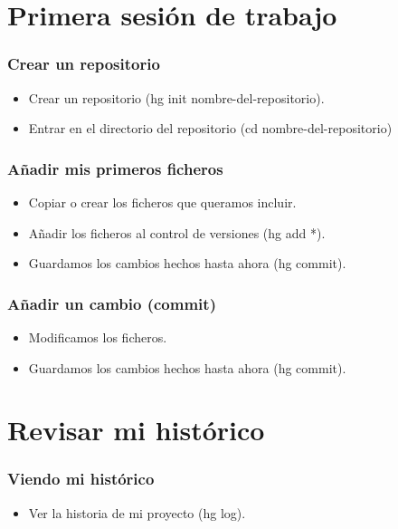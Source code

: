 \documentclass[10pt]{beamer}
\begin{document}
  \section*{Primera sesión de trabajo}

  \begin{frame}[containsverbatim]
    \frametitle{Crear un repositorio}
    \begin{itemize}
      \item Crear un repositorio (hg init nombre-del-repositorio).
      \item Entrar en el directorio del repositorio (cd nombre-del-repositorio)
    \end{itemize}
  \end{frame}

  \begin{frame}[containsverbatim]
    \frametitle{Añadir mis primeros ficheros}
    \begin{itemize}
      \item Copiar o crear los ficheros que queramos incluir.
      \item Añadir los ficheros al control de versiones (hg add *).
      \item Guardamos los cambios hechos hasta ahora (hg commit).
    \end{itemize}
  \end{frame}

  \begin{frame}[containsverbatim]
    \frametitle{Añadir un cambio (commit)}
    \begin{itemize}
      \item Modificamos los ficheros.
      \item Guardamos los cambios hechos hasta ahora (hg commit).
    \end{itemize}
  \end{frame}

  \section*{Revisar mi histórico}

  \begin{frame}[containsverbatim]
    \frametitle{Viendo mi histórico}
    \begin{itemize}
      \item Ver la historia de mi proyecto (hg log).
    \end{itemize}
  \end{frame}
\end{document}
